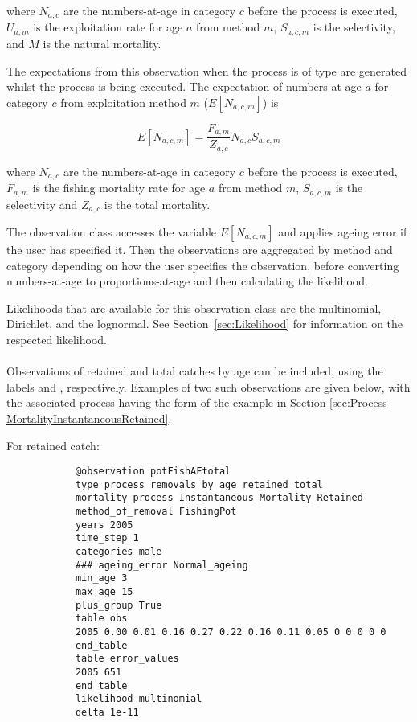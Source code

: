 \begin{itemize}
	where $N_{a,c}$ are the numbers-at-age in category $c$ before the process is executed, $U_{a,m}$ is the exploitation rate for age $a$ from method $m$, $S_{a,c,m}$ is the selectivity, and $M$ is the natural mortality.
		
	The expectations from this observation when the process is of type  are generated whilst the process is being executed. The expectation of numbers at age $a$ for category $c$ from exploitation method $m$ ($E[N_{a,c,m}]$) is
	
	\begin{equation}
	E[N_{a,c,m}] = \frac{F_{a,m}}{Z_{a,c}} N_{a,c}  S_{a,c,m}
	\end{equation}
	
	where $N_{a,c}$ are the numbers-at-age in category $c$ before the process is executed, $F_{a,m}$ is the fishing mortality rate for age $a$ from method $m$, $S_{a,c,m}$ is the selectivity and $Z_{a,c}$ is the total mortality.
	
	
	
	The observation class accesses the variable $E[N_{a,c,m}]$ and applies ageing error if the user has specified it. Then the observations are aggregated by method and category depending on how the user specifies the observation, before converting numbers-at-age to proportions-at-age and then calculating the likelihood.
	
	Likelihoods that are available for this observation class are the multinomial, Dirichlet, and the lognormal. See Section~\ref{sec:Likelihood} for information on the respected likelihood.
	
	\paragraph*{} \label{sec:Observation-ProcessRemovalsByAgeRetained} \label{sec:Observation-ProcessRemovalsByAgeRetainedTotal}
	
	Observations of retained and total catches by age can be included, using the labels  and , respectively. Examples of two such observations are given below, with the associated process  having the form of the example in Section \ref{sec:Process-MortalityInstantaneousRetained}.
	
	For retained catch:
	
	{\small{\begin{verbatim}
			@observation potFishAFtotal
			type process_removals_by_age_retained_total
			mortality_process Instantaneous_Mortality_Retained
			method_of_removal FishingPot
			years 2005
			time_step 1
			categories male
			### ageing_error Normal_ageing
			min_age 3
			max_age 15
			plus_group True
			table obs
			2005 0.00 0.01 0.16 0.27 0.22 0.16 0.11 0.05 0 0 0 0 0
			end_table
			table error_values
			2005 651
			end_table
			likelihood multinomial
			delta 1e-11
			\end{verbatim}}}
	

\end{itemize}
